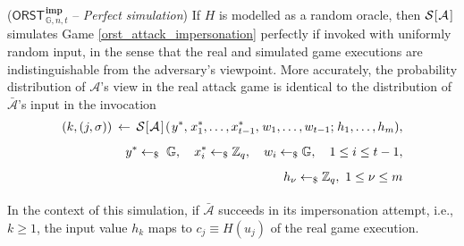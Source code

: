 \documentclass{iacrtrans}
\begin{document}
\begin{prop}\label{orst_simulated_impersonation_attack_prop}
\textup{($\mathsf{ORST}
	_{\hspace{1pt}\mathbb{G}, n, t}
	^{\hspace{1pt}\mathbf{imp}}
$
-- \textit{Perfect simulation})}
If $H$ is modelled as a random oracle, then
$
\mathcal{S}
		\hspace{.5pt}
		[
			\hspace{0.5pt}
			\mathcal{A}
			\hspace{1pt}
		]
$
simulates Game \textup{\ref{orst_attack_impersonation}} perfectly
if invoked with uniformly random input,
in the sense that the real and simulated game executions
are indistinguishable from the adversary's viewpoint.
More accurately, the probability distribution of $\mathcal{A}$'s view
in the real attack game
is identical to the distribution of $\mathcal{\bar{A}}$'s
input in the invocation
\vspace{6pt}
\begin{equation}\label{orst_attack_simulated}
\begin{split}
(k, (j, \sigma)) \hspace{2pt}\leftarrow\hspace{2pt} \mathcal{S}
		\hspace{.5pt}
		[
			\hspace{0.5pt}
			\mathcal{A}
			\hspace{1pt}
		]
		\hspace{1pt}
		(
			\hspace{1pt}
			y ^*,
			\hspace{1pt}
			x_1^*, \dots, x_{t-1}^*,
			\hspace{1pt}
			w_1, \dots, w_{t-1};
			\hspace{1pt}
			h_1, \dots, h_m
		),\\[5pt]
y^* \leftarrow_\$ \hspace{3pt}\mathbb{G},
\ \ \ x_i^* \leftarrow_\$ \mathbb{Z}_q,
\ \ \ w_i \leftarrow_\$ \mathbb{G},
\ \ \ 1 \le i \le t - 1,\\[5pt]
h_\nu \leftarrow_\$ \mathbb{Z}_q,\ 1 \le \nu \le m\\[6pt]
\end{split}
\end{equation}
In the context of this simulation, if $\mathcal{\bar{A}}$
succeeds in its impersonation attempt,
i.e., $k \ge 1$, the input value $h_k$ maps
to $c_j \equiv H(u_j)$ of the real game execution.
\end{prop}
\end{document}
